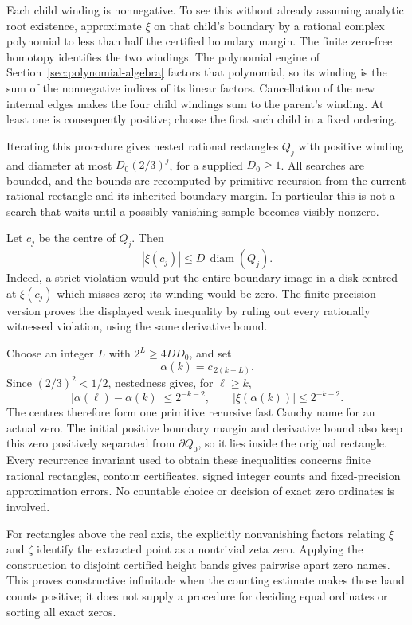 Each child winding is nonnegative. To see this without already assuming
analytic root existence, approximate $\xi$ on that child's boundary by a
rational complex polynomial to less than half the certified boundary
margin. The finite zero-free homotopy identifies the two windings. The
polynomial engine of Section~\ref{sec:polynomial-algebra} factors that
polynomial, so its winding is the sum of the nonnegative indices of its
linear factors. Cancellation of the new internal edges makes the four
child windings sum to the parent's winding. At least one is consequently
positive; choose the first such child in a fixed ordering.

Iterating this procedure gives nested rational rectangles $Q_j$ with
positive winding and diameter at most $D_0(2/3)^j$, for a supplied
$D_0\ge1$. All searches are bounded, and the bounds are recomputed by
primitive recursion from the current rational rectangle and its inherited
boundary margin. In particular this is not a search that waits until a
possibly vanishing sample becomes visibly nonzero.

Let $c_j$ be the centre of $Q_j$. Then
\[
                        |\xi(c_j)|\le D\,\operatorname{diam}(Q_j).
\]
Indeed, a strict violation would put the entire boundary image in a disk
centred at $\xi(c_j)$ which misses zero; its winding would be zero. The
finite-precision version proves the displayed weak inequality by ruling
out every rationally witnessed violation, using the same derivative bound.

Choose an integer $L$ with $2^L\ge4DD_0$, and set
\[
                         \alpha(k)=c_{\,2(k+L)}.
\]
Since $(2/3)^2<1/2$, nestedness gives, for $\ell\ge k$,
\[
       |\alpha(\ell)-\alpha(k)|\le2^{-k-2},\qquad
       |\xi(\alpha(k))|\le2^{-k-2}.
\]
The centres therefore form one primitive recursive fast Cauchy name for an
actual zero. The initial positive boundary margin and derivative bound
also keep this zero positively separated from $\partial Q_0$, so it lies
inside the original rectangle. Every recurrence invariant used to obtain these inequalities
concerns finite rational rectangles, contour certificates, signed integer
counts and fixed-precision approximation errors. No countable choice or
decision of exact zero ordinates is involved.

For rectangles above the real axis, the explicitly nonvanishing factors
relating $\xi$ and $\zeta$ identify the extracted point as a nontrivial
zeta zero. Applying the construction to disjoint certified height bands
gives pairwise apart zero names. This proves constructive infinitude when
the counting estimate makes those band counts positive; it does not supply
a procedure for deciding equal ordinates or sorting all exact zeros.
